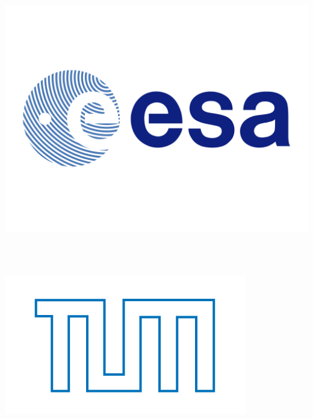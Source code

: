  \pagestyle{plain}
\thispagestyle{empty}
\begin{minipage}{0.2\textwidth}
\includegraphics[width=\textwidth]{./Images/ESA-logo-and-wordmark.png}
\end{minipage}
\begin{minipage}[r]{0.5\textwidth}
\begin{center}
\hspace*{0.5cm}  \Large {\color{Violet}    }\large \\
\hspace*{0.5cm}  {\color{Violet}       } \\
\end{center}
\end{minipage}
\begin{minipage}[r]{0.2\textwidth}
\includegraphics[width=\textwidth]{./Images/TU-Muenchen.png}
\end{minipage}
